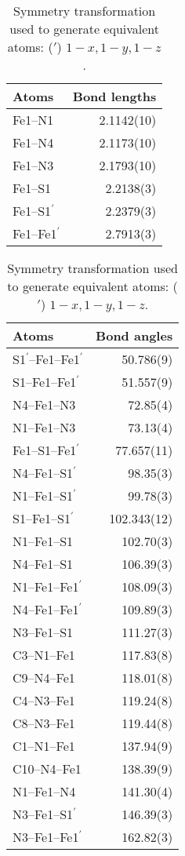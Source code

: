 \documentclass[a4paper]{scrartcl}
\begin{document}
\begin{table}[!ht]
\caption{ Selected bond lengths [\r{A}] for \textbf{mf118b} (sorted).}
\begin{tabular}{lD{.}{.}{1.4}}
\hline
\textbf{Atoms} &  \\
\hline
Fe1--N1 & 2.1142(10) \\
Fe1--N4 & 2.1173(10) \\
Fe1--N3 & 2.1793(10) \\
Fe1--S1 & 2.2138(3) \\
Fe1--S1$^{'}$ & 2.2379(3) \\
Fe1--Fe1$^{'}$ & 2.7913(3) \\

\hline
\end{tabular}
\caption*{Symmetry transformation used to generate equivalent atoms: ($'$) $1-x, 1-y, 1-z$.}
\end{table}
\begin{table}[!ht]
\caption{ Selected bond angles [$^{\circ}$] for \textbf{mf118b} (sorted).}
\begin{tabular}{lD{.}{.}{1.1}}
\hline
\textbf{Atoms} &  \\
\hline
S1$^{'}$--Fe1--Fe1$^{'}$ & 50.786(9) \\
S1--Fe1--Fe1$^{'}$ & 51.557(9) \\
N4--Fe1--N3 & 72.85(4) \\
N1--Fe1--N3 & 73.13(4) \\
Fe1--S1--Fe1$^{'}$ & 77.657(11) \\
N4--Fe1--S1$^{'}$ & 98.35(3) \\
N1--Fe1--S1$^{'}$ & 99.78(3) \\
S1--Fe1--S1$^{'}$ & 102.343(12) \\
N1--Fe1--S1 & 102.70(3) \\
N4--Fe1--S1 & 106.39(3) \\
N1--Fe1--Fe1$^{'}$ & 108.09(3) \\
N4--Fe1--Fe1$^{'}$ & 109.89(3) \\
N3--Fe1--S1 & 111.27(3) \\
C3--N1--Fe1 & 117.83(8) \\
C9--N4--Fe1 & 118.01(8) \\
C4--N3--Fe1 & 119.24(8) \\
C8--N3--Fe1 & 119.44(8) \\
C1--N1--Fe1 & 137.94(9) \\
C10--N4--Fe1 & 138.39(9) \\
N1--Fe1--N4 & 141.30(4) \\
N3--Fe1--S1$^{'}$ & 146.39(3) \\
N3--Fe1--Fe1$^{'}$ & 162.82(3) \\
\hline
\end{tabular}
\caption*{Symmetry transformation used to generate equivalent atoms: ($'$) $1-x, 1-y, 1-z$.}
\end{table}
\end{document}
